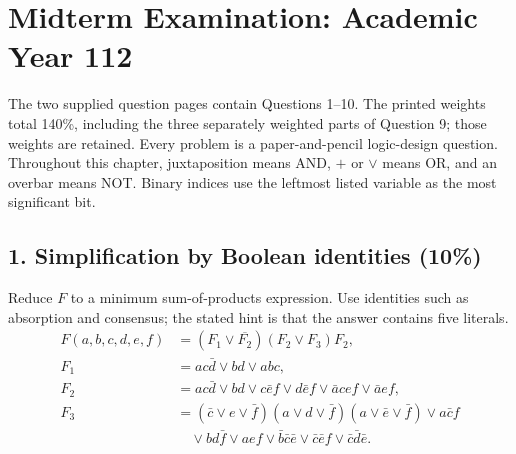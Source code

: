 \chapter{Midterm Examination: Academic Year 112}
\label{exam:midterm-112}
The two supplied question pages contain Questions 1--10. The printed weights total 140\%, including the three separately weighted parts of Question 9; those weights are retained. Every problem is a paper-and-pencil logic-design question. Throughout this chapter, juxtaposition means AND, $+$ or $\vee$ means OR, and an overbar means NOT. Binary indices use the leftmost listed variable as the most significant bit.

\section{1. Simplification by Boolean identities (10\%)}
\begin{question}
Reduce $F$ to a minimum sum-of-products expression. Use identities such as absorption and consensus; the stated hint is that the answer contains five literals.
\begin{align*}
F(a,b,c,d,e,f)&=(F_1\vee\overline{F_2})(F_2\vee F_3)F_2,\\
F_1&=ac\bar d\vee bd\vee abc,\\
F_2&=ac\bar d\vee bd\vee c\bar e f\vee d\bar e f
      \vee\bar a cef\vee\bar a ef,\\
F_3&=(\bar c\vee e\vee\bar f)(a\vee d\vee\bar f)
       (a\vee\bar e\vee\bar f)\vee a\bar c f\\
   &\quad\vee bd\bar f\vee aef\vee\bar b\bar c\bar e
       \vee\bar c\bar e f\vee\bar c\bar d\bar e.
\end{align*}
\end{question}
